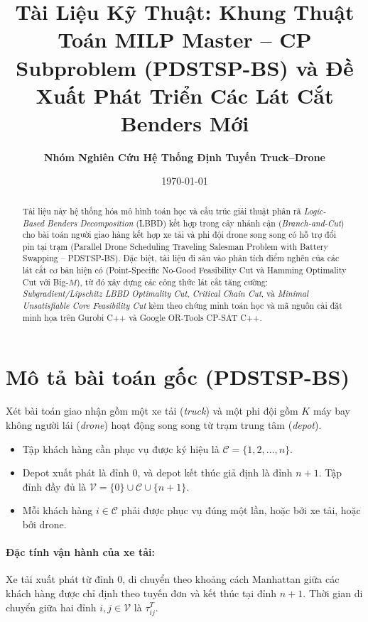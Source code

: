 \documentclass[12pt,a4paper]{article}
\title{\textbf{Tài Liệu Kỹ Thuật: Khung Thuật Toán MILP Master -- CP Subproblem (PDSTSP-BS) và Đề Xuất Phát Triển Các Lát Cắt Benders Mới}}
\author{\textbf{Nhóm Nghiên Cứu Hệ Thống Định Tuyến Truck--Drone}}
\date{\today}
\newcommand{\C}{\mathcal{C}}
\newcommand{\V}{\mathcal{V}}
\begin{document}
\maketitle

\begin{abstract}
Tài liệu này hệ thống hóa mô hình toán học và cấu trúc giải thuật phân rã \emph{Logic-Based Benders Decomposition} (LBBD) kết hợp trong cây nhánh cận (\emph{Branch-and-Cut}) cho bài toán người giao hàng kết hợp xe tải và phi đội drone song song có hỗ trợ đổi pin tại trạm (Parallel Drone Scheduling Traveling Salesman Problem with Battery Swapping -- PDSTSP-BS). Đặc biệt, tài liệu đi sâu vào phân tích điểm nghẽn của các lát cắt cơ bản hiện có (Point-Specific No-Good Feasibility Cut và Hamming Optimality Cut với Big-$M$), từ đó xây dựng các công thức lát cắt tăng cường: \emph{Subgradient/Lipschitz LBBD Optimality Cut}, \emph{Critical Chain Cut}, và \emph{Minimal Unsatisfiable Core Feasibility Cut} kèm theo chứng minh toán học và mã nguồn cài đặt minh họa trên Gurobi C++ và Google OR-Tools CP-SAT C++.
\end{abstract}

\tableofcontents
\newpage

\section{Mô tả bài toán gốc (PDSTSP-BS)}
\label{sec:problem-description}

Xét bài toán giao nhận gồm một xe tải (\emph{truck}) và một phi đội gồm $K$ máy bay không người lái (\emph{drone}) hoạt động song song từ trạm trung tâm (\emph{depot}).
\begin{itemize}[leftmargin=2em]
    \item Tập khách hàng cần phục vụ được ký hiệu là $\C = \{1, 2, \dots, n\}$.
    \item Depot xuất phát là đỉnh $0$, và depot kết thúc giả định là đỉnh $n+1$. Tập đỉnh đầy đủ là $\V = \{0\} \cup \C \cup \{n+1\}$.
    \item Mỗi khách hàng $i \in \C$ phải được phục vụ đúng một lần, hoặc bởi xe tải, hoặc bởi drone.
\end{itemize}

\paragraph{Đặc tính vận hành của xe tải:}
Xe tải xuất phát từ đỉnh $0$, di chuyển theo khoảng cách Manhattan giữa các khách hàng được chỉ định theo tuyến đơn và kết thúc tại đỉnh $n+1$. Thời gian di chuyển giữa hai đỉnh $i, j \in \V$ là $\tau^T_{ij}$.
\end{document}
